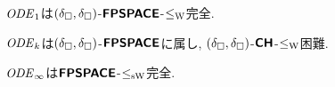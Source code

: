 \begin{theorem}
$\OpDiffIVP _1$は$(\deltabox, \deltabox)$-$\classFPSPACEtwo$-$\redW$完全. 
\end{theorem}

\begin{theorem}
$\OpDiffIVP _k$は$(\deltabox, \deltabox)$-$\classFPSPACEtwo$に属し, 
$(\deltabox, \deltabox)$-$\classCHtwo$-$\redW$困難. 
\end{theorem}

\begin{theorem}
$\OpDiffIVP _\infty$は$\classFPSPACEtwo$-$\redSW$完全. 
\end{theorem}

